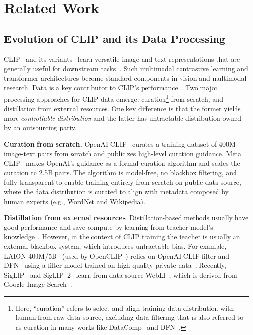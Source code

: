 \section{Related Work}
\label{related_work}

\subsection{Evolution of CLIP and its Data Processing}
CLIP~\citep{radford2021learning} and its variants~\citep{jia2021scaling,ilharco_gabriel_2021_5143773,zhai2023sigmoid} learn versatile image and text representations that are generally useful for downstream tasks~\citep{grattafiori2024llama,dai2023instructblip,liu2023visual}. Such multimodal contrastive learning and transformer architectures become standard components in vision and multimodal research.
Data is a key contributor to CLIP's performance~\citep{gadre2023datacomp,xu2024demystifying}. 
Two major processing approaches for CLIP data emerge: curation\footnote{Here, ``curation'' refers to select and align training data distribution with human from raw data source, excluding data filtering that is also referred to as curation in many works like DataComp~\citep{gadre2023datacomp, li2024datacomp} and DFN~\citep{fang2023data}.} from scratch, and distillation from external resources.
One key difference is that the former yields more \textit{controllable distribution} and the latter has untractable distribution owned by an outsourcing party.

\textbf{Curation from scratch.}
OpenAI CLIP~\citep{radford2021learning} curates a training dataset of 400M image-text pairs from scratch and publicizes high-level curation guidance. Meta CLIP~\citep{xu2024demystifying} makes OpenAI's guidance as a formal curation algorithm and scales the curation to 2.5B pairs.
The algorithm is model-free, no blackbox filtering, and fully transparent to enable training entirely from scratch on public data source, where the data distribution is curated to align with metadata composed by human experts (e.g., WordNet and Wikipedia). %

\textbf{Distillation from external resources}.
Distillation-based methods usually have good performance and save compute by learning from teacher model's knowledge~\citep{hinton2015distillingknowledgeneuralnetwork}.
However, in the context of CLIP training the teacher is usually an external blackbox system, which introduces untractable bias. 
For example, LAION-400M/5B~\citep{schuhmann2021laion,schuhmannlaion} (used by OpenCLIP~\citep{ilharco_gabriel_2021_5143773}) relies on OpenAI CLIP-filter and DFN~\citep{fang2023data} using a filter model trained on high-quality private data~\citep{ranasinghe2023perceptual}.
Recently, SigLIP~\citep{zhai2023sigmoid} and SigLIP~2~\citep{tschannen2025siglip}
learn from data source WebLI~\citep{chen2023pali}, which is derived
from Google Image Search~\citep{juan2019graph}.

